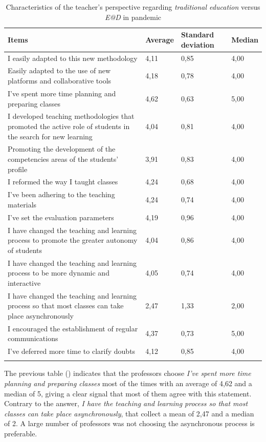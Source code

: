 \documentclass[english]{textolivre}
\begin{document}
\begin{table}[htpb]
\caption{Characteristics of the teacher's perspective regarding \emph{traditional education} versus \emph{E@D} in pandemic}
\label{tab4}
\centering
\small
\begin{tabular}{p{}p{}p{}p{}}
\toprule
Items & Average & Standard deviation & Median
\\
\midrule
\arrayrulecolor[gray]{.7}
I easily adapted to this new methodology & 4,11 & 0,85 & 4,00
\\
Easily adapted to the use of new platforms and collaborative tools & 4,18 & 0,78 & 4,00
\\
I've spent more time planning and preparing classes & 4,62 & 0,63 & 5,00
\\
I developed teaching methodologies that promoted the active role of students in the search for new learning & 4,04 & 0,81 & 4,00
\\
Promoting the development of the competencies areas of the students' profile & 3,91 & 0,83 & 4,00
\\
I reformed the way I taught classes & 4,24 & 0,68 & 4,00
\\
I've been adhering to the teaching materials & 4,24 & 0,74 & 4,00	\\
I've set the evaluation parameters & 4,19 & 0,96 & 4,00
\\
I have changed the teaching and learning process to promote the greater autonomy of students & 4,04 & 0,86 & 4,00
\\
I have changed the teaching and learning process to be more dynamic and interactive & 4,05 & 0,74 & 4,00
\\
I have changed the teaching and learning process so that most classes can take place asynchronously & 2,47 & 1,33 & 2,00
\\
I encouraged the establishment of regular communications & 4,37 & 0,73 & 5,00
\\
I've deferred more time to clarify doubts & 4,12 & 0,85 & 4,00	
\\
\arrayrulecolor{black}
\bottomrule
\end{tabular}
\centering
{}
\end{table}

The previous table () indicates that the professors choose \emph{I've spent more time planning and preparing classes} most of the times with an average of 4,62 and a median of 5, giving a clear signal that most of them agree with this statement. Contrary to the answer, \emph{I have the teaching and learning process so that most classes can take place asynchronously}, that collect a mean of 2,47 and a median of 2. A large number of professors was not choosing the asynchronous process is preferable.
\end{document}
